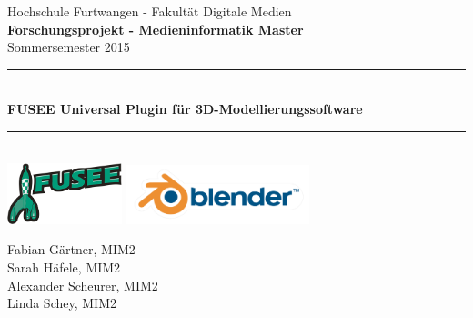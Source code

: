\begin{titlepage}

\newcommand{\HRule}{\rule{\linewidth}{0.5mm}} %

\center %
 

\Large Hochschule Furtwangen - Fakultät Digitale Medien\\[0.5cm] %
{\Large \bfseries Forschungsprojekt - Medieninformatik Master}\\[0.5cm] %
\large Sommersemester 2015\\[0.5cm] %


\HRule \\[0.2cm]
{ \huge \bfseries FUSEE Universal Plugin für 3D-Modellierungssoftware}\\[0cm] %
\HRule \\[0.7cm]
 
\includegraphics[width=0.25\textwidth]{images/FuseeLogo375}
\includegraphics[width=0.4\textwidth]{images/blender_logo}\\[1cm]


\begin{minipage}{0.55\textwidth}
\begin{flushleft} \large
Fabian Gärtner, MIM2\\
Sarah Häfele, MIM2\\
Alexander Scheurer, MIM2\\
Linda Schey, MIM2\\


\end{flushleft}
\end{minipage}
\end{titlepage}
